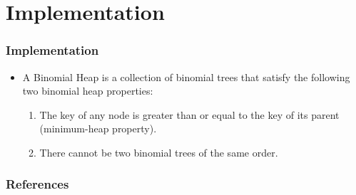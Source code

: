 \documentclass[13pt]{beamer}
\begin{document}
\section{Implementation} %
\begin{frame}
\frametitle{Implementation}
  \begin{itemize}
    \item A \alert{Binomial Heap} is a collection of binomial trees that satisfy the following two binomial heap properties:
      \begin{enumerate}
        \item The key of any node is greater than or equal to the key of its parent (minimum-heap property).
        \item There cannot be two binomial trees of the same order.
      \end{enumerate}
  \end{itemize}
\end{frame}

 \begin{frame}
  \frametitle{References}
  \nocite{*} 
  
\end{frame}
\end{document}
